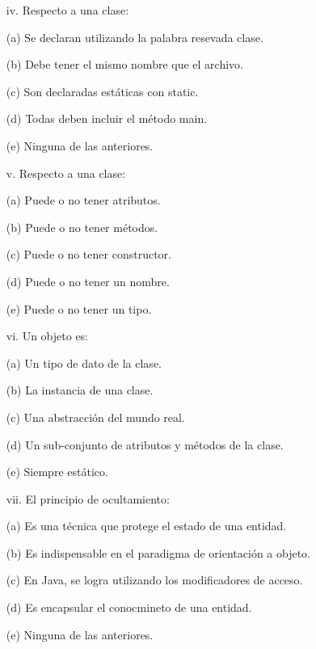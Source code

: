 \documentclass[10pt]{article}
\begin{document}
\begin{enumerate}
{\begin{multicols}{2}
    \begin{enumerate}[label=(\alph*)]
        \item[iv.] Respecto a una clase:
        \item[(a)] Se declaran utilizando la palabra resevada clase.
        \item[(b)] Debe tener el mismo nombre que el archivo.
        \item[(c)] Son declaradas est\'aticas con static.
        \item[(d)] Todas deben incluir el m\'etodo main.
        \item[(e)] Ninguna de las anteriores.
    \end{enumerate}

    \begin{enumerate}[label=(\alph*)]
        \item[v.] Respecto a una clase:
        \item[(a)] Puede o no tener atributos.
        \item[(b)] Puede o no tener m\'etodos.
        \item[(c)] Puede o no tener constructor.
        \item[(d)] Puede o no tener un nombre.
        \item[(e)] Puede o no tener un tipo.
    \end{enumerate}
    
    \begin{enumerate}[label=(\alph*)]
        \item[vi.] Un objeto es: 
        \item[(a)] Un tipo de dato de la clase.
        \item[(b)] La instancia de una clase.
        \item[(c)] Una abstracci\'on del mundo real.        
        \item[(d)] Un sub-conjunto de atributos y m\'etodos de la clase.
        \item[(e)] Siempre est\'atico.
    \end{enumerate}

    \begin{enumerate}[label=(\alph*)]
        \item[vii.] El principio de ocultamiento: 
        \item[(a)] Es una t\'ecnica que protege el estado de una entidad.
        \item[(b)] Es indispensable en el paradigma de orientaci\'on a objeto.
        \item[(c)] En Java, se logra utilizando los modificadores de acceso.
        \item[(d)] Es encapsular el conocmineto de una entidad.
        \item[(e)] Ninguna de las anteriores.
    \end{enumerate}


\end{multicols}}
\end{enumerate}
\end{document}
